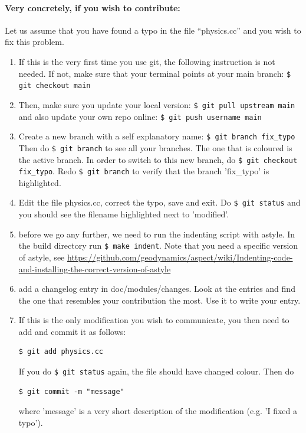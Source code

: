\paragraph{Very concretely, if you wish to contribute:} 

Let us assume that you have found a typo in the file ``physics.cc'' and you wish to 
fix this problem. 

\begin{enumerate}
\item
If this is the very first time you use git, the following instruction is not needed. If not, 
make sure that your terminal points at your main branch:
\verb"$ git checkout main"

\item
Then, make sure you update your local version:
\verb"$ git pull upstream main" 
and also update your own repo online:
\verb"$ git push username main"

\item
Create a new branch with a self explanatory name:
\verb"$ git branch fix_typo"
Then do \verb"$ git branch" to see all your branches. The one that is coloured is 
the active branch. In order to switch to this new branch, do 
\verb"$ git checkout fix_typo". Redo \verb"$ git branch" to verify that 
the branch 'fix\_typo' is highlighted.

\item
Edit the file physics.cc, correct the typo, save and exit. 
Do \verb"$ git status" and you should see the filename highlighted next to 'modified'. 

\item before we go any further, we need to run the indenting script with astyle. 
In the build directory run \verb'$ make indent'.
Note that you need a specific version of astyle, see \url{https://github.com/geodynamics/aspect/wiki/Indenting-code-and-installing-the-correct-version-of-astyle} 

\item add a changelog entry in doc/modules/changes. Look at the entries and find the one that resembles your contribution the most. Use it to 
write your entry.

\item If this is the only modification you wish to communicate, you then need to add and commit 
it as follows:
\begin{verbatim}
$ git add physics.cc
\end{verbatim}
If you do \verb'$ git status' again, the file should have changed colour. 
Then do
\begin{verbatim}
$ git commit -m "message"
\end{verbatim}
where 'message' is a very short description of the modification (e.g. 'I fixed a typo').


\end{enumerate}
